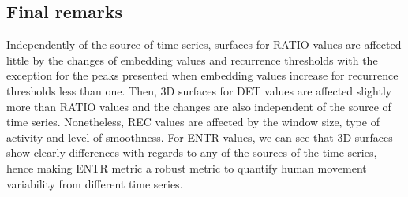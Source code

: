 \subsection{Final remarks}
Independently of the source of time series, surfaces for RATIO 
values are affected little by the changes of embedding values and recurrence 
thresholds with the exception for the peaks presented when embedding values 
increase for recurrence thresholds less than one. 
Then, 3D surfaces for DET values are affected slightly more than RATIO values
and the changes are also independent of the source of time series.
Nonetheless, REC values are affected by the window size, type of activity 
and level of smoothness.
For ENTR values, we can see that 3D surfaces show clearly differences with 
regards to any of the sources of the time series,
hence making ENTR metric a robust metric to quantify human movement 
variability from different time series.



